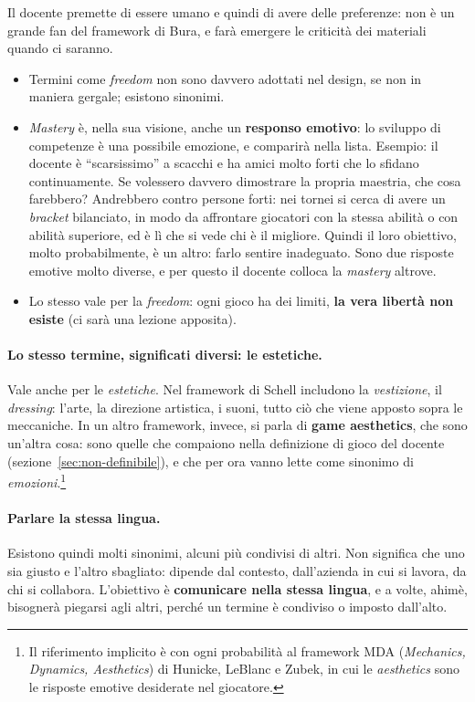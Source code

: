 Il docente premette di essere umano e quindi di avere delle preferenze: non è
un grande fan del framework di Bura, e farà emergere le criticità dei
materiali quando ci saranno.
\begin{itemize}
  \item Termini come \emph{freedom} non sono davvero adottati nel design, se
        non in maniera gergale; esistono sinonimi.
  \item \emph{Mastery} è, nella sua visione, anche un \textbf{responso
        emotivo}: lo sviluppo di competenze è una possibile emozione, e
        comparirà nella lista. Esempio: il docente è ``scarsissimo'' a
        scacchi e ha amici molto forti che lo sfidano continuamente. Se
        volessero davvero dimostrare la propria maestria, che cosa farebbero?
        Andrebbero contro persone forti: nei tornei si cerca di avere un
        \emph{bracket} bilanciato, in modo da affrontare giocatori con la
        stessa abilità o con abilità superiore, ed è lì che si vede chi è il
        migliore. Quindi il loro obiettivo, molto probabilmente, è un altro:
        farlo sentire inadeguato. Sono due risposte emotive molto diverse, e
        per questo il docente colloca la \emph{mastery} altrove.
  \item Lo stesso vale per la \emph{freedom}: ogni gioco ha dei limiti,
        \textbf{la vera libertà non esiste} (ci sarà una lezione apposita).
\end{itemize}

\paragraph{Lo stesso termine, significati diversi: le estetiche.} Vale anche
per le \emph{estetiche}. Nel framework di Schell includono la
\emph{vestizione}, il \emph{dressing}: l'arte, la direzione artistica, i
suoni, tutto ciò che viene apposto sopra le meccaniche. In un altro framework,
invece, si parla di \textbf{game aesthetics}, che sono un'altra cosa: sono
quelle che compaiono nella definizione di gioco del docente
(sezione~\ref{sec:non-definibile}), e che per ora vanno lette come
sinonimo di \emph{emozioni}.\footnote{Il riferimento implicito è con ogni
probabilità al framework MDA (\emph{Mechanics, Dynamics, Aesthetics}) di
Hunicke, LeBlanc e Zubek, in cui le \emph{aesthetics} sono le risposte
emotive desiderate nel giocatore.}

\paragraph{Parlare la stessa lingua.} Esistono quindi molti sinonimi, alcuni
più condivisi di altri. Non significa che uno sia giusto e l'altro
sbagliato: dipende dal contesto, dall'azienda in cui si lavora, da chi si
collabora. L'obiettivo è \textbf{comunicare nella stessa lingua}, e a volte,
ahimè, bisognerà piegarsi agli altri, perché un termine è condiviso o
imposto dall'alto.

